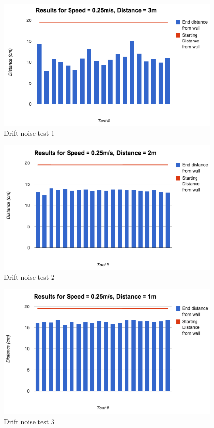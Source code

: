 \documentclass{article}
\begin{document}
	\begin{figure}[H]
	\begin{center}
	\includegraphics[width=0.9\linewidth]{ExperimentalResults4}
	\caption{Drift noise test 1}
	\end{center}
	\end{figure}
	\begin{figure}[H]
	\begin{center}
	\includegraphics[width=0.9\linewidth]{ExperimentalResults5}
	\caption{Drift noise test 2}
	\end{center}
	\end{figure}
	\begin{figure}[H]
	\begin{center}
	\includegraphics[width=0.9\linewidth]{ExperimentalResults6}
	\caption{Drift noise test 3}
	\end{center}
	\end{figure}
	
\end{document}
